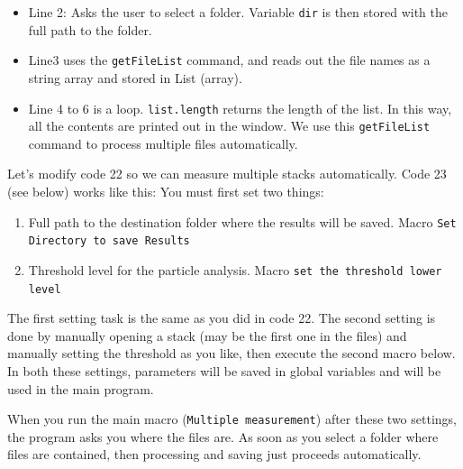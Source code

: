 \documentclass[11pt,a4paper,oneside]{report}
\newcommand{\ilcom}[1]{\texttt{\small#1}}
\begin{document}
\begin{itemize}
\item Line 2: Asks the user to select a folder. Variable \ilcom{dir} is then stored with the full path to the folder. 
\item Line3 uses the \ilcom{getFileList} command, and reads out the file names as a string array and stored in List (array). 
\item Line 4 to 6 is a loop. \ilcom{list.length} returns the length of the list. In this way, all the contents are printed out in the window. We use this \ilcom{getFileList} command to process multiple files automatically. 
\end{itemize}

Let's modify code 22 so we can measure multiple stacks automatically. Code 23 (see below) works like this: You must first set two things: 

\begin{enumerate}
\item Full path to the destination folder where the results will be saved. Macro \ilcom{Set Directory to save Results}
\item Threshold level for the particle analysis. Macro \ilcom{set the threshold lower level}
\end{enumerate}

The first setting task is the same as you did in code 22. The second setting is done by manually opening a stack (may be the first one in the files) and manually setting the threshold as you like, then execute the second macro below. In both these settings, parameters will be saved in global variables and will be used in the main program. 

When you run the main macro (\ilcom{Multiple measurement}) after these two settings, the program asks you where the files are. As soon as you select a folder where files are contained, then processing and saving just proceeds automatically. 


\end{document}
